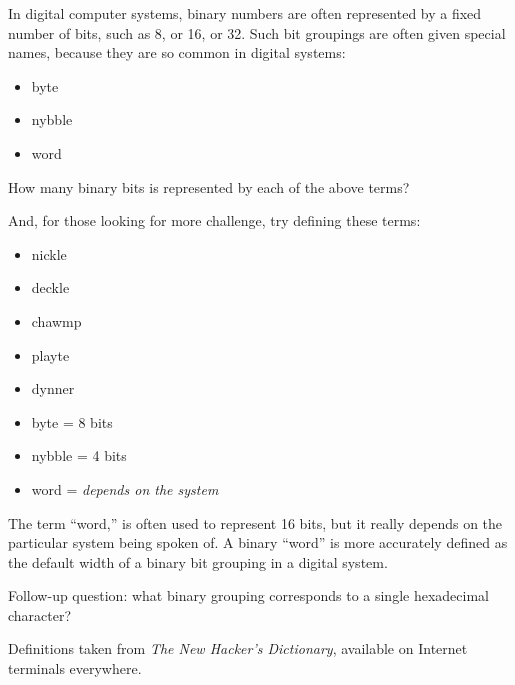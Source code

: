 

In digital computer systems, binary numbers are often represented by a fixed number of bits, such as 8, or 16, or 32.  Such bit groupings are often given special names, because they are so common in digital systems:

\begin{itemize}
\item{} byte
\item{} nybble
\item{} word
\end{itemize}

How many binary bits is represented by each of the above terms?

\vskip 10pt

And, for those looking for more challenge, try defining these terms:

\begin{itemize}
\item{} nickle
\item{} deckle
\item{} chawmp
\item{} playte
\item{} dynner
\end{itemize}







\begin{itemize}
\item{} byte = 8 bits
\item{} nybble = 4 bits
\item{} word = {\it depends on the system}
\end{itemize}

The term ``word,'' is often used to represent 16 bits, but it really depends on the particular system being spoken of.  A binary ``word'' is more accurately defined as the default width of a binary bit grouping in a digital system.

\vskip 10pt

Follow-up question: what binary grouping corresponds to a single hexadecimal character?







Definitions taken from {\it The New Hacker's Dictionary}, available on Internet terminals everywhere.




